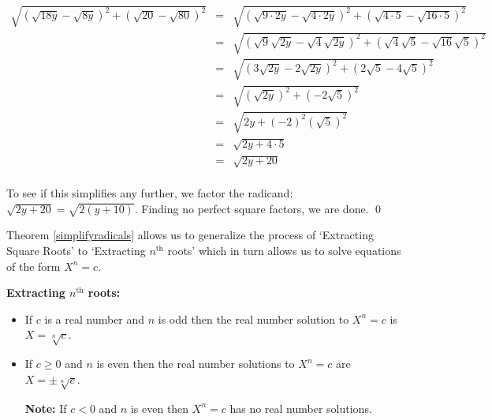 \documentclass[10pt]{article}
\begin{document}
\begin{ex}
\begin{enumerate}
\[\begin{array}{rclr}
 \sqrt{(\sqrt{18y} - \sqrt{8y})^2 + (\sqrt{20} - \sqrt{80})^2} & = & \sqrt{(\sqrt{9\cdot 2y} - \sqrt{4 \cdot 2y})^2 + (\sqrt{4\cdot 5} - \sqrt{16 \cdot 5})^2} & \\[8pt]

& = & \sqrt{(\sqrt{9} \sqrt{2y} - \sqrt{4}\sqrt{2y})^2 + (\sqrt{4}\sqrt{5} - \sqrt{16}\sqrt{5})^2} & \\[8pt]


& = & \sqrt{(3\sqrt{2y} - 2\sqrt{2y})^2 + (2\sqrt{5} - 4\sqrt{5})^2} & \\[8pt]

& = & \sqrt{(\sqrt{2y})^2 + (-2\sqrt{5})^2} & \\[8pt]


& = & \sqrt{2y + (-2)^2(\sqrt{5})^2} & \\[8pt]


& = & \sqrt{2y + 4\cdot 5} & \\[8pt]

& = & \sqrt{2y + 20} & \\ 

\end{array} \]

To see if this simplifies any further, we factor the radicand:  $\sqrt{2y+20} = \sqrt{2(y+10)}$.  Finding no perfect square factors, we are done. \qed

\end{enumerate}


\end{ex}


Theorem \ref{simplifyradicals} allows us to generalize the process of `Extracting Square Roots' to `Extracting $n^{\text{th}}$ roots' which in turn allows us to solve equations of the form $X^n  = c$.

\label{extractingnthroots}

\medskip

\colorbox{ResultColor}{\bbm

\centerline{\textbf{Extracting $n^{\text{th}}$ roots:}}

\begin{itemize}

\item If $c$ is a real number and $n$ is odd then the real number solution to $X^{n} = c$ is $X = \sqrt[n]{c}$.

\item  If $c \geq 0$ and $n$ is even then the real number solutions to $X^{n} = c$ are $X = \pm \sqrt[n]{c}$.

\textbf{Note:} If $c < 0$ and $n$ is even then $X^{n} = c$ has no real number solutions.

\end{itemize}

\ebm}
\end{document}
